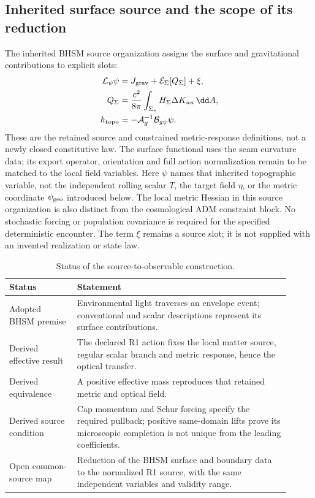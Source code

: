 
\subsection{Inherited surface source and the scope of its reduction}
The inherited BHSM source organization assigns the surface and gravitational
contributions to explicit slots:
\begin{align}
 \mathcal L_\psi\psi&=J_{\rm grav}+\mathcal E_\Sigma[Q_\Sigma]+\xi,\nonumber\\
 Q_\Sigma&=\frac{c^2}{8\pi}\int_{\Sigma_\star}
 H_\Sigma\Delta K_{uu}\,\dd A,\nonumber\\
 h_{\rm topo}&=-\mathcal A_g^{-1}\mathcal B_{g\psi}\psi .
 \label{eq:inherited-bhsm-source}
\end{align}
These are the retained source and constrained metric-response definitions,
not a newly closed constitutive law. The surface functional uses the seam
curvature data; its export operator, orientation and full action
normalization remain to be matched to the local field variables. Here
$\psi$ names that inherited topographic variable, not the independent
rolling scalar $T$, the target field $\eta$, or the metric coordinate
$\psi_{\rm geo}$ introduced below. The local metric Hessian in this source
organization is also distinct from the cosmological ADM constraint block.
No stochastic forcing or population covariance is required for the
specified deterministic encounter. The term $\xi$ remains a source slot;
it is not supplied with an invented realization or state law.

\begin{table}[htbp]
 \centering
 \caption{Status of the source-to-observable construction.}
 \begin{tabular}{>{\raggedright\arraybackslash}p{0.22\linewidth}>{\raggedright\arraybackslash}p{0.69\linewidth}}
 \toprule
 Status & Statement \\
 \midrule
 Adopted BHSM premise & Environmental light traverses an envelope event;
 conventional and scalar descriptions represent its surface contributions.\\
 Derived effective result & The declared R1 action fixes the local matter source,
 regular scalar branch and metric response, hence the optical transfer.\\
 Derived equivalence & A positive effective mass reproduces that retained
 metric and optical field.\\
 Derived source condition & Cap momentum and Schur forcing specify the
 required pullback; positive same-domain lifts prove its microscopic
 completion is not unique from the leading coefficients.\\
 Open common-source map & Reduction of the BHSM surface and boundary data to
 the normalized R1 source, with the same independent variables and validity range.\\
 \bottomrule
 \end{tabular}
\end{table}

